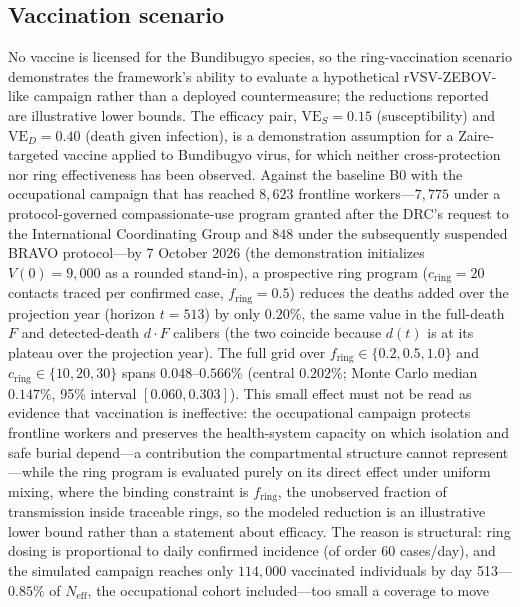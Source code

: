 \documentclass[preprint,12pt,numbers]{elsarticle}
\begin{document}
\subsection{Vaccination scenario}\label{sec:vacc}

No vaccine is licensed for the Bundibugyo species, so the
ring-vaccination scenario demonstrates the framework's ability to
evaluate a hypothetical rVSV-ZEBOV-like campaign rather than a deployed
countermeasure; the reductions reported are illustrative lower bounds.
The efficacy pair, $\mathrm{VE}_S=0.15$ (susceptibility) and
$\mathrm{VE}_D=0.40$ (death given infection), is a demonstration
assumption for a Zaire-targeted vaccine applied to Bundibugyo virus, for
which neither cross-protection nor ring effectiveness has been observed.
Against the baseline B0 with the occupational campaign that has reached
$8{,}623$ frontline workers---$7{,}775$ under a protocol-governed
compassionate-use program granted after the DRC's request to the
International Coordinating Group  and $848$ under
the subsequently suspended BRAVO protocol---by 7
October 2026 (the demonstration initializes $V(0)=9{,}000$ as a rounded
stand-in), a prospective ring program ($c_{\mathrm{ring}}=20$ contacts
traced per confirmed case, $f_{\mathrm{ring}}=0.5$) reduces the deaths
added over the projection year (horizon $t=513$) by only $0.20\%$, the
same value in the full-death $F$ and detected-death $d\cdot F$ calibers
(the two coincide because $d(t)$ is at its plateau over the projection
year). The full grid over
$f_{\mathrm{ring}}\in\{0.2,0.5,1.0\}$ and
$c_{\mathrm{ring}}\in\{10,20,30\}$ spans $0.048$--$0.566\%$ (central
$0.202\%$; Monte Carlo median $0.147\%$, 95\% interval $[0.060,0.303]$).
This small effect must not be
read as evidence that vaccination is ineffective: the occupational
campaign protects frontline workers and preserves the health-system
capacity on which isolation and safe burial depend---a contribution the
compartmental structure cannot represent---while the ring program is
evaluated purely on its direct effect under uniform mixing, where the
binding constraint is $f_{\mathrm{ring}}$, the unobserved fraction of
transmission inside traceable rings, so the modeled reduction is an
illustrative lower bound rather than a statement about efficacy. The
reason is structural: ring dosing is proportional to daily confirmed
incidence (of order 60 cases/day), and the simulated campaign reaches
only $114{,}000$ vaccinated individuals by day 513---$0.85\%$ of
$N_{\mathrm{eff}}$, the occupational cohort included---too small a
coverage to move
\end{document}
